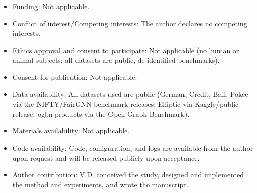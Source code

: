 \documentclass[pdflatex,sn-mathphys-num]{sn-jnl}
\theoremstyle{thmstyleone}%
\theoremstyle{thmstyletwo}%
\theoremstyle{thmstylethree}%
\begin{document}
\begin{itemize}
\item Funding: Not applicable.
\item Conflict of interest/Competing interests: The author declares no competing interests.
\item Ethics approval and consent to participate: Not applicable (no human or animal subjects; all datasets are public, de-identified benchmarks).
\item Consent for publication: Not applicable.
\item Data availability: All datasets used are public (German, Credit, Bail, Pokec via the NIFTY/FairGNN benchmark releases; Elliptic via Kaggle/public release; ogbn-products via the Open Graph Benchmark).
\item Materials availability: Not applicable.
\item Code availability: Code, configuration, and logs are available from the author upon request and will be released publicly upon acceptance.
\item Author contribution: V.D. conceived the study, designed and implemented the method and experiments, and wrote the manuscript.
\end{itemize}
\end{document}
